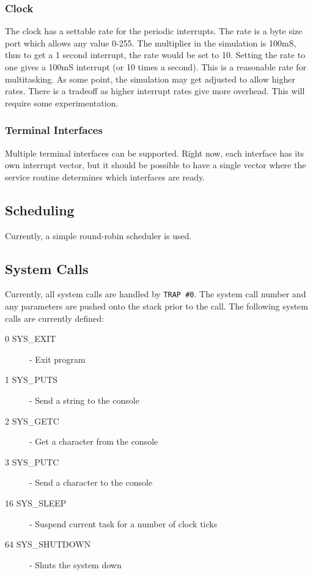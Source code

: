 \documentclass[10pt]{book}
\begin{document}
\subsubsection{Clock}
The clock has a settable rate for the periodic interrupts.  The rate is a byte size port which allows any value 0-255.  The multiplier in the simulation is 100mS, thus to get a 1 second interrupt, the rate would be set to 10.  Setting the rate to one gives a 100mS interrupt (or 10 times a second).  This is a reasonable rate for multitasking.  As some point, the simulation may get adjusted to allow higher rates.  There is a tradeoff as higher interrupt rates give more overhead.  This will require some experimentation.

\subsubsection{Terminal Interfaces}
Multiple terminal interfaces can be supported.  Right now, each interface has its own interrupt vector, but it should be possible to have a single vector where the service routine determines which interfaces are ready.

\subsection{Scheduling}
Currently, a simple round-robin scheduler is used.

\subsection{System Calls}
Currently, all system calls are handled by \verb|TRAP #0|.  The system call number and any parameters are pushed onto the stack prior to the call.  The following system calls are currently defined:
\begin{description}
  \item[0 SYS\_EXIT] - Exit program
  \item[1 SYS\_PUTS] - Send a string to the console
  \item[2 SYS\_GETC] - Get a character from the console
  \item[3 SYS\_PUTC] - Send a character to the console
  \item[16 SYS\_SLEEP] - Suspend current task for a number of clock ticks
  \item[64 SYS\_SHUTDOWN] - Shuts the system down
\end{description}

\end{document}
